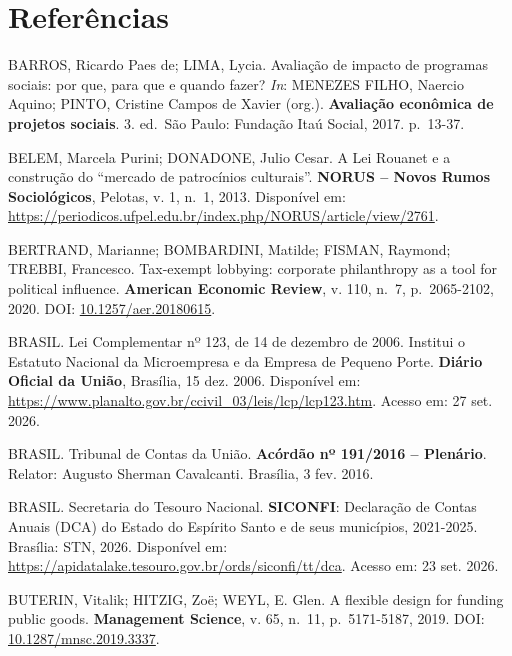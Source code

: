 \documentclass[12pt,a4paper]{article}
\newenvironment{referencias}{\raggedright\setlength{\parindent}{0pt}\setlength{\parskip}{0.5\baselineskip}}{\par}
\begin{document}
\section*{Referências}
\begin{referencias}
\protect{}\label{ref-barros-1}{}BARROS, Ricardo Paes de; LIMA, Lycia. Avaliação de
impacto de programas sociais: por que, para que e quando fazer? \emph{In}: MENEZES FILHO, Naercio
Aquino; PINTO, Cristine Campos de Xavier (org.). \textbf{Avaliação econômica de projetos sociais}.
3. ed.~São Paulo: Fundação Itaú Social, 2017. p.~13-37.

\protect{}\label{ref-belem-2}{}BELEM, Marcela Purini; DONADONE, Julio Cesar. A Lei
Rouanet e a construção do ``mercado de patrocínios culturais''. \textbf{NORUS -- Novos Rumos
Sociológicos}, Pelotas, v. 1, n.~1, 2013. Disponível em:
\url{https://periodicos.ufpel.edu.br/index.php/NORUS/article/view/2761}.

\protect{}\label{ref-bertrand-3}{}BERTRAND, Marianne; BOMBARDINI, Matilde; FISMAN,
Raymond; TREBBI, Francesco. Tax-exempt lobbying: corporate philanthropy as a tool for political
influence. \textbf{American Economic Review}, v. 110, n.~7, p.~2065-2102, 2020. DOI:
\href{https://doi.org/10.1257/aer.20180615}{10.1257/aer.20180615}.

\protect{}\label{ref-brasil-4}{}BRASIL. Lei Complementar nº 123, de 14 de dezembro de
2006. Institui o Estatuto Nacional da Microempresa e da Empresa de Pequeno Porte. \textbf{Diário
Oficial da União}, Brasília, 15 dez. 2006. Disponível em:
\url{https://www.planalto.gov.br/ccivil_03/leis/lcp/lcp123.htm}. Acesso em: 27 set. 2026.

\protect{}\label{ref-brasil-5}{}BRASIL. Tribunal de Contas da União. \textbf{Acórdão nº
191/2016 -- Plenário}. Relator: Augusto Sherman Cavalcanti. Brasília, 3 fev. 2016.

\protect{}\label{ref-brasil-6}{}BRASIL. Secretaria do Tesouro Nacional.
\textbf{SICONFI}: Declaração de Contas Anuais (DCA) do Estado do Espírito Santo e de seus
municípios, 2021-2025. Brasília: STN, 2026. Disponível em:
\url{https://apidatalake.tesouro.gov.br/ords/siconfi/tt/dca}. Acesso em: 23 set. 2026.

\protect{}\label{ref-buterin-7}{}BUTERIN, Vitalik; HITZIG, Zoë; WEYL, E. Glen. A
flexible design for funding public goods. \textbf{Management Science}, v. 65, n.~11, p.~5171-5187,
2019. DOI: \href{https://doi.org/10.1287/mnsc.2019.3337}{10.1287/mnsc.2019.3337}.


\end{referencias}
\end{document}

